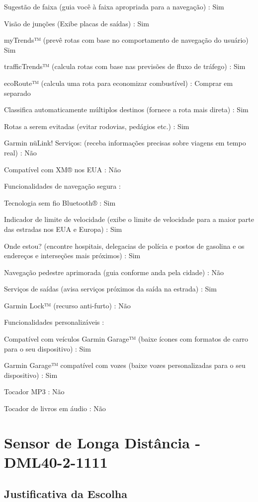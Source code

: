 Sugestão de faixa (guia você à faixa apropriada para a navegação) : Sim

Visão de junções (Exibe placas de saídas) : Sim

myTrends™ (prevê rotas com base no comportamento de navegação do usuário) Sim

trafficTrends™ (calcula rotas com base nas previsões de fluxo de tráfego) : Sim

ecoRoute™ (calcula uma rota para economizar combustível) : Comprar em separado

Classifica automaticamente múltiplos destinos (fornece a rota mais direta) : Sim

Rotas a serem evitadas (evitar rodovias, pedágios etc.) : Sim

Garmin nüLink! Serviços: (receba informações precisas sobre viagens em tempo real) : Não

Compatível com XM® nos EUA : Não

Funcionalidades de navegação segura :

Tecnologia sem fio Bluetooth® : Sim

Indicador de limite de velocidade (exibe o limite de velocidade para a maior parte das estradas nos EUA e Europa) : Sim

Onde estou? (encontre hospitais, delegacias de polícia e postos de gasolina e os endereços e interseções mais próximos) : Sim

Navegação pedestre aprimorada (guia conforme anda pela cidade) : Não

Serviços de saídas (avisa serviços próximos da saída na estrada) : Sim

Garmin Lock™ (recurso anti-furto) : Não


Funcionalidades personalizáveis :

Compatível com veículos Garmin Garage™ (baixe ícones com formatos de carro para o seu dispositivo) : Sim

Garmin Garage™ compatível com vozes (baixe vozes personalizadas para o seu dispositivo) : Sim

Tocador MP3 : Não

Tocador de livros em áudio : Não


\section{Sensor de Longa Distância - DML40-2-1111}


\subsection{Justificativa da Escolha}

